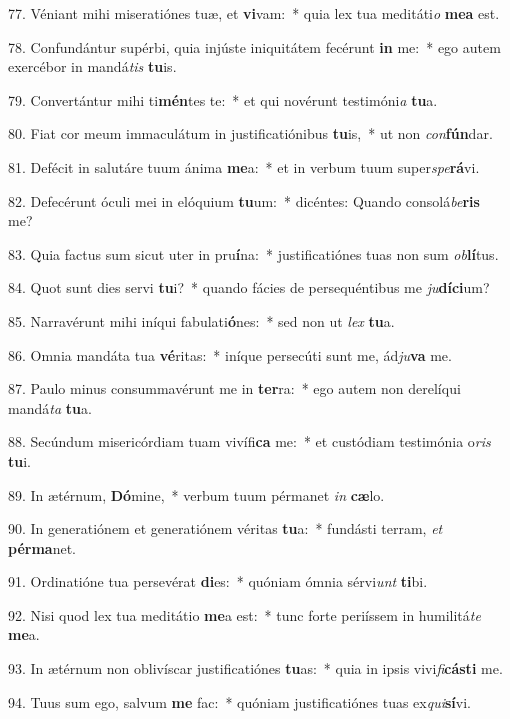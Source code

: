 77. Véniant mihi miseratiónes tuæ, et \textbf{vi}vam:~*  quia lex tua meditáti\textit{o} \textbf{me}\textbf{a} est.\

78. Confundántur supérbi, quia injúste iniquitátem fecérunt \textbf{in} me:~*  ego autem exercébor in mandá\textit{tis} \textbf{tu}is.\

79. Convertántur mihi ti\textbf{mén}tes te:~*  et qui novérunt testimóni\textit{a} \textbf{tu}a.\

80. Fiat cor meum immaculátum in justificatiónibus \textbf{tu}is,~*  ut non \textit{con}\textbf{fún}dar.\

81. Defécit in salutáre tuum ánima \textbf{me}a:~*  et in verbum tuum super\textit{spe}\textbf{rá}vi.\

82. Defecérunt óculi mei in elóquium \textbf{tu}um:~*  dicéntes: Quando consolá\textit{be}\textbf{ris} me?\

83. Quia factus sum sicut uter in pru\textbf{í}na:~*  justificatiónes tuas non sum \textit{ob}\textbf{lí}tus.\

84. Quot sunt dies servi \textbf{tu}i?~*  quando fácies de persequéntibus me \textit{ju}\textbf{dí}\textbf{ci}um?\

85. Narravérunt mihi iníqui fabulati\textbf{ó}nes:~*  sed non ut \textit{lex} \textbf{tu}a.\

86. Omnia mandáta tua \textbf{vé}ritas:~*  iníque persecúti sunt me, ád\textit{ju}\textbf{va} me.\

87. Paulo minus consummavérunt me in \textbf{ter}ra:~*  ego autem non derelíqui mandá\textit{ta} \textbf{tu}a.\

88. Secúndum misericórdiam tuam vivífi\textbf{ca} me:~*  et custódiam testimónia o\textit{ris} \textbf{tu}i.\

89. In ætérnum, \textbf{Dó}mine,~*  verbum tuum pérmanet \textit{in} \textbf{cæ}lo.\

90. In generatiónem et generatiónem véritas \textbf{tu}a:~*  fundásti terram, \textit{et} \textbf{pér}\textbf{ma}net.\

91. Ordinatióne tua persevérat \textbf{di}es:~*  quóniam ómnia sérvi\textit{unt} \textbf{ti}bi.\

92. Nisi quod lex tua meditátio \textbf{me}a est:~*  tunc forte periíssem in humilitá\textit{te} \textbf{me}a.\

93. In ætérnum non oblivíscar justificatiónes \textbf{tu}as:~*  quia in ipsis vivi\textit{fi}\textbf{cás}\textbf{ti} me.\

94. Tuus sum ego, salvum \textbf{me} fac:~*  quóniam justificatiónes tuas ex\textit{qui}\textbf{sí}vi.\

